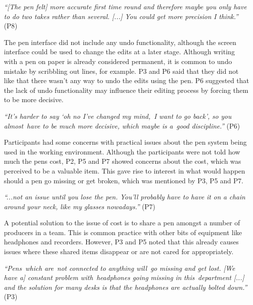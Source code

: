 \textit{``[The pen felt] more accurate first time round and therefore maybe you only have to do two takes rather than
several. [...] You could get more precision I think.''} (P8)

The pen interface did not include any undo functionality, although the screen interface could be used to change the
edits at a later stage. Although writing with a pen on paper is already considered permanent, it is common to undo
mistake by scribbling out lines, for example. P3 and P6 said that they did not like that there wasn't any way to undo
the edits using the pen. P6 suggested that the lack of undo functionality may influence their editing process by
forcing them to be more decisive.

\textit{``It's harder to say `oh no I've changed my mind, I want to go back', so you almost have to be much more
decisive, which maybe is a good discipline.''} (P6)



Participants had some concerns with practical issues about the pen system being used in the working environment.
Although the participants were not told how much the pens cost, P2, P5 and P7 showed concerns about the cost, which was
perceived to be a valuable item.  This gave rise to interest in what would happen should a pen go missing or get
broken, which was mentioned by P3, P5 and P7. 

\textit{``...not an issue until you lose the pen. You'll probably have to have it on a chain around your neck, like my
glasses nowadays.''} (P7)

A potential solution to the issue of cost is to share a pen amongst a number of producers in a team. This is
common practice with other bits of equipment like headphones and recorders. However, P3 and P5 noted that this already
causes issues where these shared items disappear or are not cared for appropriately.

\textit{``Pens which are not connected to anything will go missing and get lost.
  [We have a] constant problem with headphones going missing in this department [...]
and the solution for many desks is that the headphones are actually bolted down.''} (P3)

